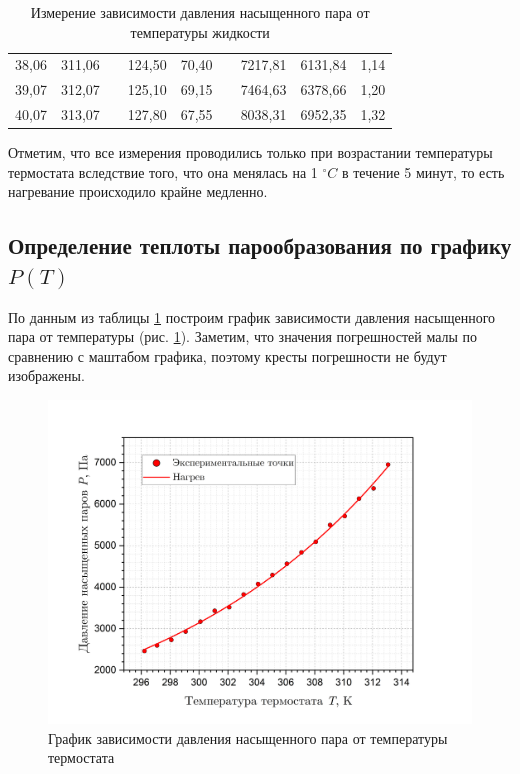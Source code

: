 \documentclass[a4paper, 12pt]{article}
\begin{document}
\begin{table}[H]
\begin{tabular}{|c|c|c|c|c|c|c|c|c|}
        38,06 & 311,06 &  & 124,50 & 70,40 &  & 7217,81 & 6131,84 & 1,14 \\ \cline{1-2} \cline{4-5} \cline{7-9} 
        39,07 & 312,07 &  & 125,10 & 69,15 &  & 7464,63 & 6378,66 & 1,20 \\ \cline{1-2} \cline{4-5} \cline{7-9} 
        40,07 & 313,07 &  & 127,80 & 67,55 &  & 8038,31 & 6952,35 & 1,32 \\ \hline
        \end{tabular}
        \caption{Измерение зависимости давления насыщенного пара от температуры жидкости}
        \label{tab:measures}
    \end{table}

    \noindent Отметим, что все измерения проводились только при возрастании температуры термостата вследствие того, что она менялась на 1 $^\circ C$ в течение 5 минут, то есть нагревание происходило крайне медленно.

    \subsection*{Определение теплоты парообразования по графику $ P(T) $}

    \noindent По данным из таблицы \ref{tab:measures} построим график зависимости давления насыщенного пара от температуры (рис. \ref{graph1}). Заметим, что значения погрешностей малы по сравнению с маштабом графика, поэтому кресты погрешности не будут изображены.

    \begin{figure}[H]
        \centering
        \includegraphics[width = 15cm]{images/P(T).png}
        \caption{График зависимости давления насыщенного пара от температуры термостата}
        \label{graph1}
    \end{figure}
\end{document}
